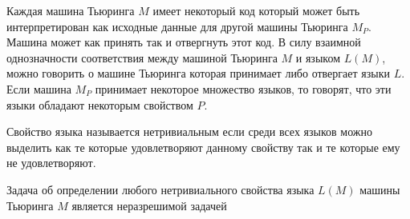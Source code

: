 Каждая машина Тьюринга $M$ имеет некоторый код который может быть 
интерпретирован как исходные данные для другой машины Тьюринга $M_P$. 
Машина может как принять так и отвергнуть этот код. В силу взаимной
однозначности соответствия между машиной Тьюринга $M$ и языком 
$L\left(M\right)$, можно говорить о машине Тьюринга
которая принимает либо отвергает языки $L$. Если машина $M_P$
принимает некоторое множество языков, то говорят, 
что эти языки обладают некоторым свойством $P$.

\begin{definition}
Свойство языка называется нетривиальным если среди всех языков можно
выделить как те которые удовлетворяют данному свойству так и те
которые ему не удовлетворяют.
\end{definition}

\begin{theorem}[Райс]
Задача об определении любого нетривиального свойства языка 
$L\left(M\right)$ машины Тьюринга $M$ является неразрешимой задачей
\end{theorem}

